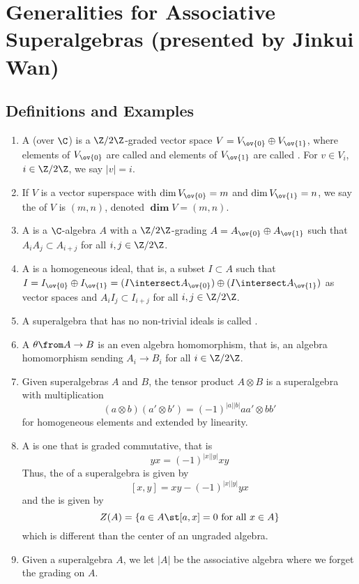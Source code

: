 \documentclass[11pt,leqno,oneside]{amsbook}
\newcommand{\grdim}{\boldsymbol{\dim}}
\numberwithin{thm}{section}
\begin{document}
\section{Generalities for Associative Superalgebras (presented by
  Jinkui Wan)}
\subsection{Definitions and Examples}
\begin{defn}
  \begin{enumerate}
  \item   A  (over \(\C\)) is a
    \(\Z/2\Z\)-graded vector space 
    \(V = V_{\ov{0}} \oplus V_{\ov{1}}\), where elements of
    \(V_{\ov{0}}\) are called  and elements of \(V_{\ov{1}}\)
    are called . For \(v \in V_i\), \(i \in \Z/2\Z\), we say
    \(|v| = i\).
  \item If \(V\) is a vector superspace with \(\dim V_{\ov{0}} = m\)
    and \(\dim V_{\ov{1}} = n\), we say the  of
    \(V\) is \((m,n)\), denoted \(\grdim V = (m,n)\).
  \item A  is a \(\C\)-algebra \(A\) with a
    \(\Z/2\Z\)-grading \(A = A_{\ov{0}} \oplus A_{\ov{1}}\) such that
    \(A_i A_j \subset A_{i+j}\) for all \(i,j \in \Z/2\Z\).
  \item A  is a homogeneous ideal, that is, a
    subset \(I \subset A\) such that \(I = I_{\ov{0}} \oplus
    I_{\ov{1}} = (I \intersect A_{\ov{0}}) \oplus (I \intersect
    A_{\ov{1}})\) as vector spaces and \(A_i I_j \subset I_{i+j}\) for
    all \(i,j \in 
    \Z/2\Z\). 
  \item A superalgebra that has no non-trivial ideals is called
    .
  \item A  \(\theta \from A \to B\) is
    an even algebra homomorphism, that is, an algebra homomorphism
    sending \(A_i \to B_i\) for all \(i \in \Z/2\Z\).
  \item Given superalgebras \(A\) and \(B\), the tensor product \(A
    \otimes B\) is a superalgebra with multiplication \[
      (a \otimes b)(a' \otimes b') = (-1)^{|a||b|} aa' \otimes bb'
    \]
    for homogeneous elements and extended by linearity.
  \item A  is one that is graded
    commutative, that is \[
      yx = (-1)^{|x||y|}xy
    \]
    Thus, the  of a superalgebra is given by \[
      [x,y] = xy-(-1)^{|x||y|}yx
    \]
    and the  is given by \[
      Z(A) = \{a \in A \st [a,x] = 0 \text{ for all }x \in A\}
    \]
    which is different than the center of an ungraded algebra.
  \item Given a superalgebra \(A\), we let \(|A|\) be the associative
    algebra where we forget the grading on \(A\). 
  \end{enumerate}
\end{defn}
\end{document}
